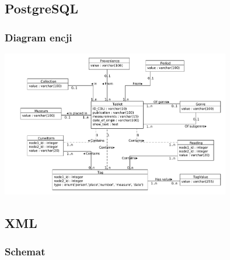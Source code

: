 \documentclass[xcolor=dvipsnames,10pt]{beamer}
\begin{document}
\subsection{PostgreSQL}
\begin{frame}
 \frametitle{Diagram encji}
 \includegraphics[width=100mm]{./diagramy/diagram-encji-maly.pdf}
\end{frame}


\subsection{XML}
\begin{frame}
 \frametitle{Schemat}

\end{frame}


%    
% 
% 
\end{document}
